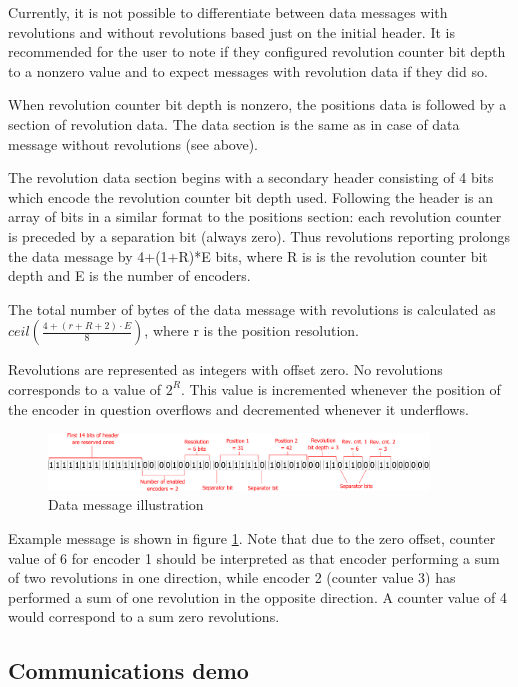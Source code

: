 \documentclass[twoside]{article}
\begin{document}
Currently, it is not possible to differentiate between data messages with revolutions and without revolutions based just on the initial header. It is recommended for the user to note if they configured revolution counter bit depth to a nonzero value and to expect messages with revolution data if they did so.

When revolution counter bit depth is nonzero, the positions data is followed by a section of revolution data. The data section is the same as in case of data message without revolutions (see above).

The revolution data section begins with a secondary header consisting of 4 bits which encode the revolution counter bit depth used. Following the header is an array of bits in a similar format to the positions section: each revolution counter is preceded by a separation bit (always zero). Thus revolutions reporting prolongs the data message by 4+(1+R)*E bits, where R is is the revolution counter bit depth and E is the number of encoders.

The total number of bytes of the data message with revolutions is calculated as  $ceil(\frac{4+(r+R+2)\cdot{}E}{8})$, where r is the position resolution. 

Revolutions are represented as integers with offset zero. No revolutions corresponds to a value of $2^R$. This value is incremented whenever the position of the encoder in question overflows and decremented whenever it underflows.

\begin{figure}[h]
	\centering
	\includegraphics[width=0.9\textwidth]{figs/reply3}
	\caption{Data message illustration}
\label{fig:3}
\end{figure}

Example message is shown in figure \ref{fig:3}. Note that due to the zero offset, counter value of 6 for encoder 1 should be interpreted as that encoder performing a sum of two revolutions in one direction, while encoder 2 (counter value 3) has performed a sum of one revolution in the opposite direction. A counter value of 4 would correspond to a sum zero revolutions.

\newpage{}
\subsection{Communications demo}
\end{document}
